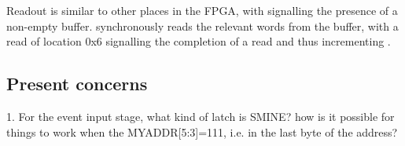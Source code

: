 Readout is similar to other places in the FPGA, with
 signalling the presence of a non-empty
buffer.  synchronously reads the relevant
words from the buffer, with a read of location 0x6 signalling the
completion of a read and thus incrementing
.

\subsection{Present concerns}
     1. For the event input stage, what kind of latch is SMINE? how is it possible for things to work when the MYADDR[5:3]=111, i.e.  in the last byte of the address?

